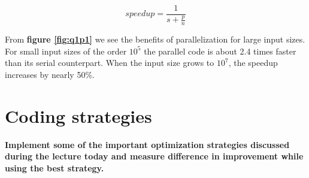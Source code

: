 \documentclass[12,a4paper]{article}
\begin{document}
    \begin{equation}
        speedup = \frac{1}{s + \frac{p}{n}}
    \end{equation}
    
    From \textbf{figure \ref{fig:q1p1}} we see the benefits of parallelization for large input sizes. For small input sizes of the order $10^5$ the parallel code is about 2.4 times faster than its serial counterpart. When the input size grows to $10^7$, the speedup increases by nearly 50\%.
    
    \section{Coding strategies}
    \textbf{
        Implement some of the important optimization strategies discussed during the lecture today and measure difference in improvement while using the best strategy.
    }
\end{document}
